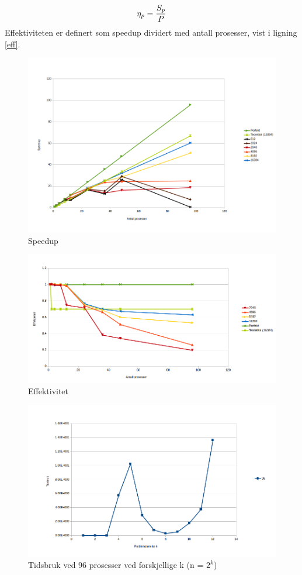 \documentclass{article}
\begin{document}
\begin{equation}
	\label{eff}
	\eta_{p} = {S_{p} \over P} 
\end{equation}
Effektiviteten er definert som speedup dividert med antall prosesser, vist i ligning \ref{eff}. \\ 

\begin{figure}[t]
	\centering
	\includegraphics[width=12cm]{img/speedup.png}
	\caption{Speedup}
	\label{fig:speedup}
		
\end{figure}

\begin{figure}[t]
	\centering
	\includegraphics[width=12cm]{img/efficiency.png}
	\caption{Effektivitet}		
	\label{fig:eff}
\end{figure}

\begin{figure}[t]
	\centering
	\includegraphics[width=12cm]{img/time_p_96.png}
	\caption{Tidsbruk ved 96 prosesser ved forskjellige k (n = $2^{k}$)}		
	\label{fig:p96}
\end{figure}
\end{document}

